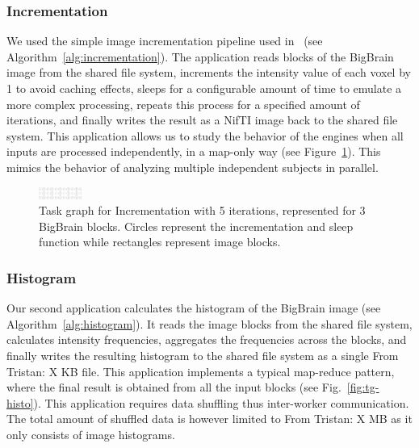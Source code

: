 \documentclass[conference]{IEEEtran}
\newcommand{\TG}[1]{\color{cyan}From Tristan: #1 \color{black}}
\begin{document}
\subsubsection{Incrementation}
We used the simple image incrementation pipeline used
in~\cite{hayot2019performance} (see Algorithm~\ref{alg:incrementation}).
The application reads blocks of the BigBrain image from the shared file
system, increments the intensity value of each voxel by 1 to avoid caching
effects, sleeps for a configurable amount of time to emulate a more complex
processing, repeats this process for a specified amount of iterations, and
finally writes the result as a NifTI image back to the shared file system.
This application allows us to study the behavior of the engines when all
inputs are processed independently, in a map-only way (see
Figure~\ref{fig:tg-inc}). This mimics the behavior of analyzing multiple
independent subjects in parallel.

\begin{algorithm}[!b]
    \caption{Incrementation (adapted from~\cite{hayot2019performance})}\label{alg:incrementation}
    \begin{algorithmic}
        \EndFor
    \EndFor
\end{algorithmic}
\end{algorithm}

\begin{figure}[!b]
    \centering
    \includegraphics[width=0.125\textwidth,
    angle=-90]{images/incrementation-task-graph.png}
    \caption{Task graph for Incrementation with 5 iterations, represented
    for 3 BigBrain blocks. Circles represent the incrementation and sleep
    function while rectangles represent image blocks.}\label{fig:tg-inc}
\end{figure}

\subsubsection{Histogram}

 Our second application calculates the histogram of the BigBrain image (see
 Algorithm~\ref{alg:histogram}). It reads the image blocks from the shared
 file system, calculates intensity frequencies, aggregates the frequencies
 across the blocks, and finally writes the resulting histogram to the
 shared file system as a single \TG{X}KB file. This application implements
 a typical map-reduce pattern, where the final result is obtained from all
 the input blocks (see Fig.~\ref{fig:tg-histo}). This application requires
 data shuffling thus inter-worker communication. The total amount of shuffled
 data is however limited to \TG{X}MB as it only consists of image
 histograms.
\end{document}
